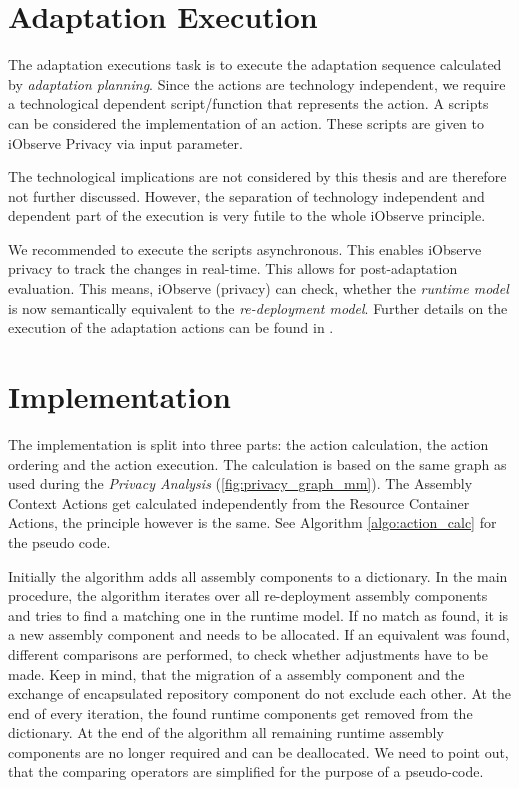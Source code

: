 \section{Adaptation Execution}
\label{sec:SysAdap:exec}

The adaptation executions task is to execute the adaptation sequence calculated by \textit{adaptation planning}. Since the actions are technology independent, we require a technological dependent script/function that represents the action. A scripts can be considered the implementation of an action. These scripts are given to iObserve Privacy via input parameter.

The technological implications are not considered by this thesis and are therefore not further discussed. However, the separation of technology independent and dependent part of the execution is very futile to the whole iObserve principle.

We recommended to execute the scripts asynchronous. This enables iObserve privacy to track the changes in real-time. This allows for post-adaptation evaluation. This means, iObserve (privacy) can check, whether the \textit{runtime model} is now semantically equivalent to the \textit{re-deployment model}. Further details on the execution of the adaptation actions can be found in \cite{TobiasPoppke.20170626}.


\section{Implementation}
\label{sec:SysAdap:impl}


The implementation is split into three parts: the action calculation, the action ordering and the action execution. The calculation is based on the same graph as used during the \textit{Privacy Analysis} (\autoref{fig:privacy_graph_mm}). The Assembly Context Actions get calculated independently from the Resource Container Actions, the principle however is the same. See Algorithm \autoref{algo:action_calc} for the pseudo code.

Initially the algorithm adds all assembly components to a dictionary. In the main procedure, the algorithm iterates over all re-deployment assembly components and tries to find a matching one in the runtime model. If no match as found, it is a new assembly component and needs to be allocated. If an equivalent was found, different comparisons are performed, to check whether adjustments have to be made. Keep in mind, that the migration of a assembly component and the exchange of encapsulated repository component do not exclude each other. At the end of every iteration, the found runtime components get removed from the dictionary. At the end of the algorithm all remaining runtime assembly components are no longer required and can be deallocated. We need to point out, that the comparing operators are simplified for the purpose of a pseudo-code.

